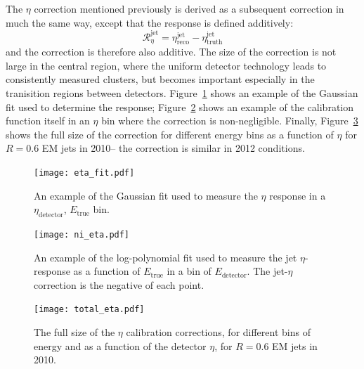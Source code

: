 
The $\eta$ correction mentioned previously is derived as a subsequent correction in much the same way, except that the response is defined additively:
%
\begin{equation}
\mathcal{R}_\eta^\mathrm{jet} = \eta^{\mathrm{jet}}_{\mathrm{reco}} -  \eta^{\mathrm{jet}}_{\mathrm{truth}} 
\end{equation}
%
and the correction is therefore also additive. The size of the correction is not large in the central region, where the uniform detector technology leads to consistently measured clusters, but becomes important especially in the tranisition regions between detectors. Figure~\ref{fig:jet-reconstruction:eta-fit} shows an example of the Gaussian fit used to determine the response; Figure~\ref{fig:jet-reconstruction:ni-eta} shows an example of the calibration function itself in an $\eta$ bin where the correction is non-negligible. Finally, Figure~\ref{fig:jet-reconstruction:total-eta} shows the full size of the correction for different energy bins as a function of $\eta$ for $R=0.6$ EM jets in 2010-- the correction is similar in 2012 conditions.


\begin{figure}
\centering
\texttt{[image: eta\_fit.pdf]}
\label{fig:jet-reconstruction:eta-fit}
\caption{An example of the Gaussian fit used to measure the $\eta$ response in a $\eta_\mathrm{detector}$, $E_\mathrm{true}$ bin.}
\end{figure}



\begin{figure}
\centering
\texttt{[image: ni\_eta.pdf]}
\label{fig:jet-reconstruction:ni-eta}
\caption{An example of the log-polynomial fit used to measure the jet $\eta$-response as a function of $E_\mathrm{true}$ in a bin of $E_\mathrm{detector}$. The jet-$\eta$ correction is the negative of each point.}
\end{figure}



\begin{figure}
\centering
\texttt{[image: total\_eta.pdf]}
\label{fig:jet-reconstruction:total-eta}
\caption{The full size of the $\eta$ calibration corrections, for different bins of energy and as a function of the detector $\eta$, for $R=0.6$ EM jets in 2010.}
\end{figure}

